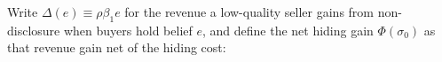 Write $\Delta(e)\equiv\rho\beta_1 e$ for the revenue a low-quality seller gains from non-disclosure when buyers hold belief $e$, and define the net hiding gain $\Phi(\sigma_0)$ as that revenue gain net of the hiding cost:
